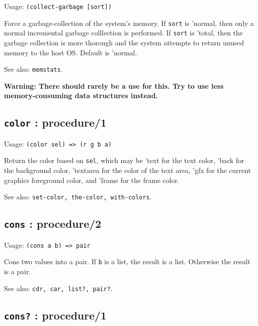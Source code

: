 \documentclass[
]{article}
\newcommand{\passthrough}[1]{#1}
\begin{document}
Usage: \passthrough{\lstinline!(collect-garbage [sort])!}

Force a garbage-collection of the system's memory. If
\passthrough{\lstinline!sort!} is 'normal, then only a normal
incremental garbage colllection is performed. If
\passthrough{\lstinline!sort!} is 'total, then the garbage collection is
more thorough and the system attempts to return unused memory to the
host OS. Default is 'normal.

See also: \passthrough{\lstinline!memstats!}.

\textbf{Warning: There should rarely be a use for this. Try to use less
memory-consuming data structures instead.}

\hypertarget{color-procedure1-1}{%
\subsection{\texorpdfstring{\texttt{color} :
procedure/1}{color : procedure/1}}\label{color-procedure1-1}}

Usage: \passthrough{\lstinline!(color sel) => (r g b a)!}

Return the color based on \passthrough{\lstinline!sel!}, which may be
'text for the text color, 'back for the background color, 'textarea for
the color of the text area, 'gfx for the current graphics foreground
color, and 'frame for the frame color.

See also: \passthrough{\lstinline!set-color, the-color, with-colors!}.

\hypertarget{cons-procedure2-1}{%
\subsection{\texorpdfstring{\texttt{cons} :
procedure/2}{cons : procedure/2}}\label{cons-procedure2-1}}

Usage: \passthrough{\lstinline!(cons a b) => pair!}

Cons two values into a pair. If \passthrough{\lstinline!b!} is a list,
the result is a list. Otherwise the result is a pair.

See also: \passthrough{\lstinline!cdr, car, list?, pair?!}.

\hypertarget{cons-procedure1-1}{%
\subsection{\texorpdfstring{\texttt{cons?} :
procedure/1}{cons? : procedure/1}}\label{cons-procedure1-1}}
\end{document}
